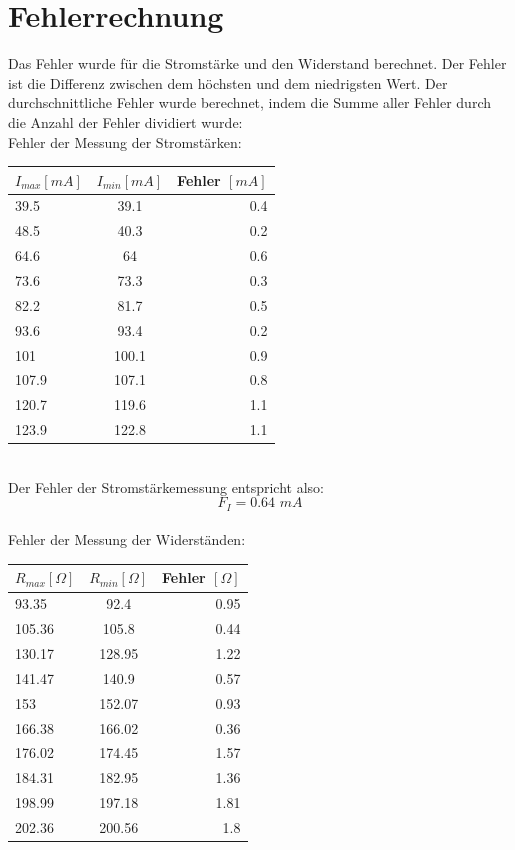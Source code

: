 \documentclass[12pt, a4paper, twoside]{article}
\begin{document}
    \section{Fehlerrechnung}
    Das Fehler wurde für die Stromstärke und den Widerstand berechnet. Der Fehler ist die Differenz zwischen dem höchsten und dem niedrigsten Wert. Der durchschnittliche Fehler wurde berechnet, indem die Summe aller Fehler durch die Anzahl der Fehler dividiert wurde:
    \vspace{1cm}\\
    Fehler der Messung der Stromstärken:
    \vspace{1cm}\\
        \begin{tabular}{l|c|r}
            $I_{max} [mA]$ & $I_{min} [mA]$ &Fehler $[mA]$\\
            \hline
            39.5   & 39.1   &  0.4  \\
            48.5   & 40.3   & 0.2  \\
            64.6   & 64   & 0.6  \\
            73.6   & 73.3   & 0.3  \\
            82.2   & 81.7   & 0.5  \\
            93.6   & 93.4   & 0.2  \\
            101   & 100.1   & 0.9  \\
            107.9 & 107.1 & 0.8 \\
            120.7   & 119.6   & 1.1  \\
            123.9   & 122.8   & 1.1  
        \end{tabular}
        \vspace{1cm}\\
        Der Fehler der Stromstärkemessung entspricht also:
        \[F_I = 0.64 \hspace{4pt} mA\]
        \vspace{1cm}\\
        Fehler der Messung der Widerständen:
        \vspace{1cm}\\
        \begin{tabular}{l|c|r}
            $R_{max} [\Omega]$ & $R_{min} [\Omega]$ & Fehler $[\Omega]$\\
            \hline
            93.35 & 92.4 & 0.95 \\
            105.36 & 105.8 & 0.44 \\
            130.17 & 128.95 & 1.22 \\
            141.47 & 140.9 & 0.57 \\
            153 & 152.07 & 0.93 \\
            166.38 & 166.02 & 0.36 \\
            176.02 & 174.45 & 1.57 \\
            184.31 & 182.95 & 1.36 \\
            198.99 & 197.18 & 1.81 \\
            202.36 & 200.56 & 1.8
        \end{tabular}
\end{document}
